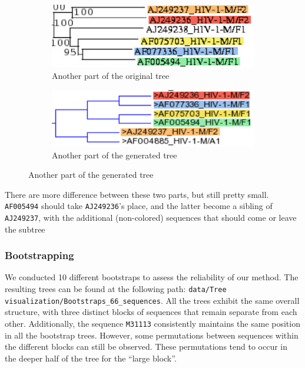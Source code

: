 \documentclass[english,13pt,a4paper]{article}
\theoremstyle{definition}
\theoremstyle{remark}
\theoremstyle{defstyle}
\begin{document}
\begin{figure}[H]
    \centering
    \begin{subfigure}{0.48\textwidth}
        \centering
        \includegraphics[width=\textwidth]{Images/Example_Orig66.png}
        \caption{Another part of the original tree}
    \end{subfigure}
    \hfill
    \begin{subfigure}{0.48\textwidth}
        \centering
        \includegraphics[width=\textwidth]{Images/Example_66.png}
        \caption{Another part of the generated tree}
    \end{subfigure}
\end{figure}

There are more difference between these two parts, but still pretty small. \texttt{AF005494} should take \texttt{AJ249236}'s place, and the latter become a sibling of \texttt{AJ249237}, with the additional (non-colored) sequences that should come or leave the subtree 

\subsubsection{Bootstrapping}

We conducted 10 different bootstraps to assess the reliability of our method. The resulting trees can be found at the following path: \texttt{data/Tree visualization/Bootstraps\_66\_sequences}. All the trees exhibit the same overall structure, with three distinct blocks of sequences that remain separate from each other. Additionally, the sequence \texttt{M31113} consistently maintains the same position in all the bootstrap trees. However, some permutations between sequences within the different blocks can still be observed. These permutations tend to occur in the deeper half of the tree for the ``large block''.\\
\end{document}
